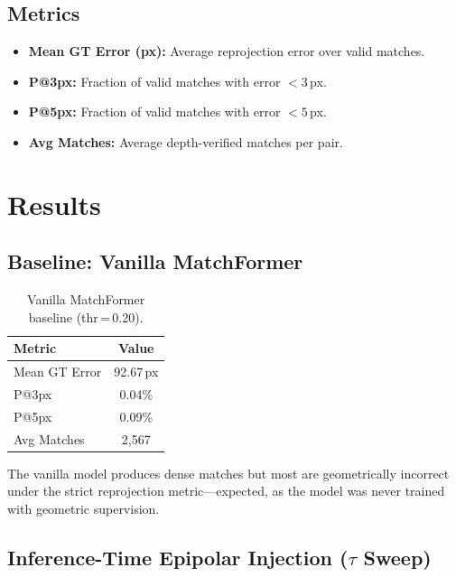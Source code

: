 \documentclass[10pt]{article}
\begin{document}
\subsection{Metrics}

\begin{itemize}[leftmargin=*,itemsep=1pt]
    \item \textbf{Mean GT Error (px):} Average reprojection error over valid matches.
    \item \textbf{P@3px:} Fraction of valid matches with error $< 3$\,px.
    \item \textbf{P@5px:} Fraction of valid matches with error $< 5$\,px.
    \item \textbf{Avg Matches:} Average depth-verified matches per pair.
\end{itemize}

\section{Results}

\subsection{Baseline: Vanilla MatchFormer}

\begin{table}[H]
\centering
\caption{Vanilla MatchFormer baseline (thr\,=\,0.20).}
\label{tab:vanilla}
\small
\begin{tabular}{lc}
\toprule
\textbf{Metric} & \textbf{Value} \\
\midrule
Mean GT Error & 92.67\,px \\
P@3px         & 0.04\%    \\
P@5px         & 0.09\%    \\
Avg Matches   & 2,567     \\
\bottomrule
\end{tabular}
\end{table}

The vanilla model produces dense matches but most are geometrically incorrect under the strict reprojection metric—expected, as the model was never trained with geometric supervision.

\subsection{Inference-Time Epipolar Injection ($\tau$ Sweep)}
\end{document}
